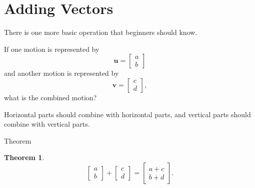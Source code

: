 \documentclass[11pt,a4paper]{article}
\newtheorem{theorem}{Theorem}[section]
\newcommand{\vect}[1]{\boldsymbol{#1}}
\begin{document}
\section{Adding Vectors}

There is one more basic operation that beginners should know.

\begin{problemblock}
If one motion is represented by
\[
\vect{u} =
\begin{bmatrix}
a \\ b
\end{bmatrix}
\]
and another motion is represented by
\[
\vect{v} =
\begin{bmatrix}
c \\ d
\end{bmatrix},
\]
what is the combined motion?
\end{problemblock}

\begin{intuitionblock}
Horizontal parts should combine with horizontal parts, and vertical parts should
combine with vertical parts.
\end{intuitionblock}

\begin{center}
\end{center}

\begin{mathblock}{Theorem}
\begin{theorem}
\[
\begin{bmatrix}
a \\ b
\end{bmatrix}
+
\begin{bmatrix}
c \\ d
\end{bmatrix}
=
\begin{bmatrix}
a+c \\ b+d
\end{bmatrix}.
\]
\end{theorem}
\end{mathblock}
\end{document}
